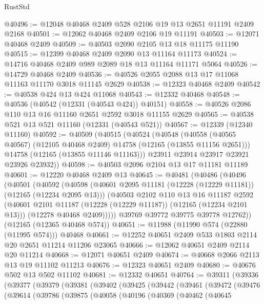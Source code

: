 \begin{lexlean}{RustStd}
\begin{coremodule}
@40496 := @12048 @40468 @2409 @528 @2106 @19 @13 @2651 @11191 @2409 @2168
@40501 := @12062 @40468 @2409 @2106 @19 @11191
@40503 := @12071 @40468 @2409
@40509 := @40503 @2090 @2105 @13 @18 @11175 @11190
@40515 := @12399 @40468 @2409 @2090 @13 @11164 @11173
@40524 := @14716 @40468 @2409 @989 @2089 @18 @13 @11164 @11171 @5064
@40526 := @14729 @40468 @2409
@40536 := @40526 @2055 @2088 @13 @17 @11068 @11163 @11170 @3018 @11145 @2629
@40538 := @12323 @40468 @2409
@40542 := @40538 @424 @13 @424 @11068
@40543 := @12332 @40468
@40548 := @40536 (@40542 (@12331 (@40543 @424)) @40151)
@40558 := @40526 @2086 @110 @13 @16 @11160 @2651 @2592 @3018 @11155 @2629
@40565 := @40538 @521 @13 @521 @11160 (@12331 (@40543 @521))
@40567 := @12339 (@12340 @11160)
@40592 := @40509
    (@40515
      (@40524
        (@40548
          (@40558 (@40565 @40567) (@12105 @40468 @2409) @14758 (@12165 (@13855 @11156 @2651)))
          @14758
          (@12165 (@13855 @11146 @11163)))
        @23911
        @23914
        @23917
        @23921
        @23926
        @23932))
@40598 := @40503 @2096 @2104 @13 @17 @11181 @11189
@40601 := @12220 @40468 @2409 @13
@40645 := @40481
    (@40486
      (@40496
        (@40501
          (@40592
            (@40598
              (@40601 @2095 @11181 (@12228 (@12229 @11181)) (@12165 (@12234 @2095 @13)))
              (@40503
                @2102
                @110
                @13
                @16
                @11187
                @2592
                (@40601 @2101 @11187 (@12228 (@12229 @11187)) (@12165 (@12234 @2101 @13)))
                (@12278 @40468 @2409)))))
        @39769
        @39772
        @39775
        @39778
        @12762))
    (@12165 (@12365 @40468 @574))
@40651 := @11988 (@11990 @574 (@22880 (@11995 @574))) @40468
@40661 := @12252 @40651 @2409 @533 @1803 @2114 @20 @2651 @11214 @11206 @23065
@40666 := @12062 @40651 @2409 @2114 @20 @11214
@40668 := @12071 @40651 @2409
@40674 := @40668 @2066 @2113 @13 @19 @11102 @11213
@40676 := @12323 @40651 @2409
@40680 := @40676 @502 @13 @502 @11102
@40681 := @12332 @40651
@40764 := @39311
    (@39336
      (@39377
        (@39379
          (@39381
            (@39402
              (@39425
                (@39442
                  (@39461
                    (@39472
                      (@39476
                        (@39614
                          (@39786
                            (@39875
                              (@40058
                                (@40196
                                  (@40369
                                    (@40462
                                      (@40645

\end{coremodule}
\end{lexlean}
